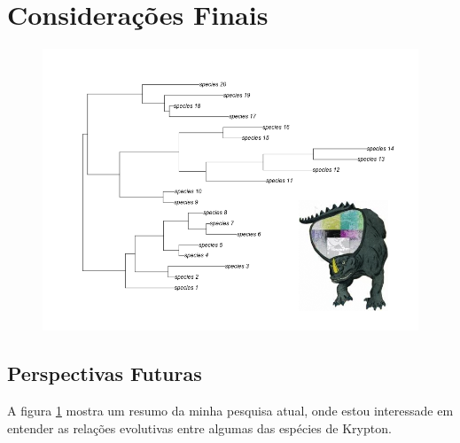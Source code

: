 \section{Considerações Finais}
\label{sec:consideracoes}  

\lipsum[34-36]

\begin{figure}[!b]
    \centering
    \includegraphics[width=1\textwidth]{figuras/species_krypton.png}
    \caption{\lipsum[37]}
    \label{fig:figura_1}
\end{figure}

\subsection{Perspectivas Futuras}
\label{subsec:perspectivas}  

A figura \ref{fig:figura_1} mostra um resumo da minha pesquisa atual, onde estou interessade em entender as relações evolutivas entre algumas das espécies de Krypton.

\lipsum[38-40]
